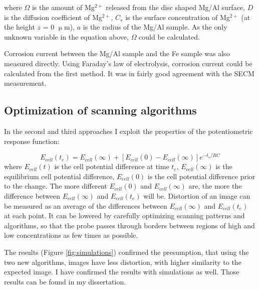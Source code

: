 where $\Omega$ is the amount of Mg$^{2+}$ released from the disc shaped Mg/Al surface, $D$ is the diffusion coefficient of Mg$^{2+}$, $C_s$ is the surface concentration of Mg$^{2+}$ (at the height $z$ = 0 $\upmu$m), $a$ is the radius of the Mg/Al sample.
As the only unknown variable in the equation above, $\Omega$ could be calculated.

Corrosion current between the Mg/Al sample and the Fe sample was also measured directly.
Using Faraday's law of electrolysis, corrosion current could be calculated from the first method.
It was in fairly good agreement with the SECM measurement.

\subsection{Optimization of scanning algorithms}
In the second and third approaches I exploit the properties of the potentiometric response function:

\begin{equation}
\label{eq:rc}
        E_{cell}(t_{e}) = E_{cell}(\infty) + [E_{cell}(0) - E_{cell}(\infty)]e^{-t_{e}/RC}
\end{equation}
where $E_{cell}(t)$ is the cell potential difference at time $t_{e}$, $E_{cell}(\infty)$ is the equilibrium cell potential difference, $E_{cell}(0)$ is the cell potential difference prior to the change.
The more different $E_{cell}(0)$ and $E_{cell}(\infty)$ are, the more the difference between $E_{cell}(\infty)$ and $E_{cell}(t_{e})$ will be.
Distortion of an image can be measured as an average of the differences between $E_{cell}(\infty)$ and $E_{cell}(t_{e})$ at each point.
It can be lowered by carefully optimizing scanning patterns and algorithms, so that the probe passes through borders between regions of high and low concentrations as few times as possible.

The results (Figure \ref{fig:simulations}) confirmed the presumption, that using the two new algorithms, images have less distortion, with higher similarity to the expected image.
I have confirmed the results with simulations as well.
Those results can be found in my dissertation.

